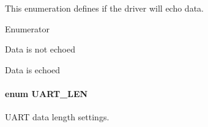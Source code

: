 This enumeration defines if the driver will echo data. \begin{Desc}
\item[Enumerator]\par
\begin{description}
\item[{\em 
U\-A\-R\-T\-\_\-\-E\-C\-H\-O\-\_\-\-O\-F\-F\label{_u_a_r_t_8h_aac6a03c2e1d76f53e1d9d923dcdc24f2a2b286f182793d4a71bdf99409b9600dd}
}]Data is not echoed \item[{\em 
U\-A\-R\-T\-\_\-\-E\-C\-H\-O\-\_\-\-O\-N\label{_u_a_r_t_8h_aac6a03c2e1d76f53e1d9d923dcdc24f2a6c4d8a2d4e30c22cf9fa45cd1bf79306}
}]Data is echoed \end{description}
\end{Desc}
\paragraph[{U\-A\-R\-T\-\_\-\-L\-E\-N}]{\setlength{\rightskip}{0pt plus 5cm}enum {\bf U\-A\-R\-T\-\_\-\-L\-E\-N}}\label{_u_a_r_t_8h_adf245d5f10db0abcbd8ad62a0d80c694}


U\-A\-R\-T data length settings. 

